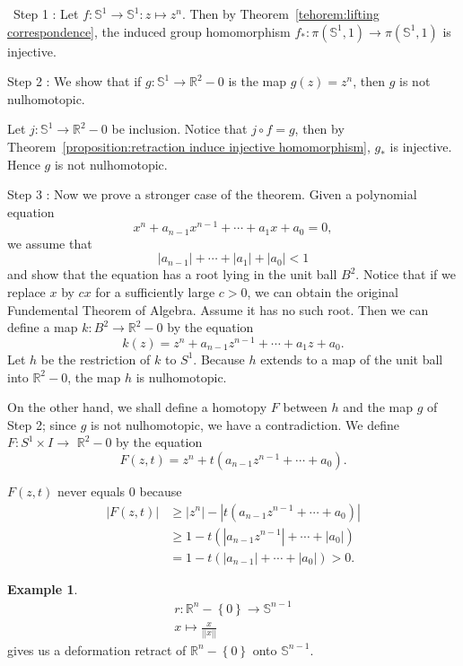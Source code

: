 \documentclass[12pt,a4paper]{book}
\newenvironment{prooff}{{\noindent\it\textcolor{cyan!40!black}{Proof}:}\,}{\par}
\newcommand{\bbrace}[1]{\left\{ #1 \right\} }
\newcommand{\bb}[1]{\mathbb{#1}}
\theoremstyle{definition}
\newtheorem{exam}[defn]{Example}
\begin{document}
\begin{prooff}
    Step 1 : Let $f:\bb{S}^1\rightarrow \bb{S}^1: z\mapsto z^n$. Then by Theorem~\ref{tehorem:lifting correspondence}, the induced group homomorphism $f_*:\pi(\bb{S}^1,1)\rightarrow \pi(\bb{S}^1,1)$ is injective.

    Step 2 : We show that if $g: \bb{S}^1 \rightarrow \mathbb{R}^2-0$ is the map $g(z)=z^n$, then $g$ is not nulhomotopic.

    Let $j:\bb{S}^1\rightarrow \mathbb{R}^2-0$ be inclusion. Notice that $j\circ f=g $, then by Theorem~\ref{proposition:retraction induce injective homomorphism}, $g_*$ is injective. Hence $g$ is not nulhomotopic.

    Step 3 : Now we prove a stronger case of the theorem. Given a polynomial equation
    $$
        x^n+a_{n-1} x^{n-1}+\cdots+a_1 x+a_0=0,
    $$
    we assume that
    $$
        \left|a_{n-1}\right|+\cdots+\left|a_1\right|+\left|a_0\right|<1
    $$
    and show that the equation has a root lying in the unit ball $B^2$. Notice that if we replace $x$ by $cx$ for a sufficiently large $c>0$, we can obtain the original Fundemental Theorem of Algebra.
    Assume it has no such root. Then we can define a map $k: B^2 \rightarrow \mathbb{R}^2-0$ by the equation
    $$
        k(z)=z^n+a_{n-1} z^{n-1}+\cdots+a_1 z+a_0 .
    $$
    Let $h$ be the restriction of $k$ to $S^1$. Because $h$ extends to a map of the unit ball into $\mathbb{R}^2-0$, the map $h$ is nulhomotopic.

    On the other hand, we shall define a homotopy $F$ between $h$ and the map $g$ of Step 2; since $g$ is not nulhomotopic, we have a contradiction. We define $F: S^1 \times I \rightarrow$ $\mathbb{R}^2-0$ by the equation
    $$
        F(z, t)=z^n+t\left(a_{n-1} z^{n-1}+\cdots+a_0\right) .
    $$

    $F(z, t)$ never equals $0$ because
    $$
        \begin{aligned}
            |F(z, t)| & \geq\left|z^n\right|-\left|t\left(a_{n-1} z^{n-1}+\cdots+a_0\right)\right| \\
                      & \geq 1-t\left(\left|a_{n-1} z^{n-1}\right|+\cdots+\left|a_0\right|\right)  \\
                      & =1-t\left(\left|a_{n-1}\right|+\cdots+\left|a_0\right|\right)>0 .
        \end{aligned}
    $$
\end{prooff}

\begin{exam}
    \begin{align*}
        r: \bb{R}^n-\bbrace{0}\rightarrow \bb{S}^{n-1} \\
        x\mapsto \frac{x}{||x||}
    \end{align*}
    gives us a deformation retract of $\bb{R}^n-\bbrace{0}$ onto $\bb{S}^{n-1}$.
\end{exam}
\end{document}
